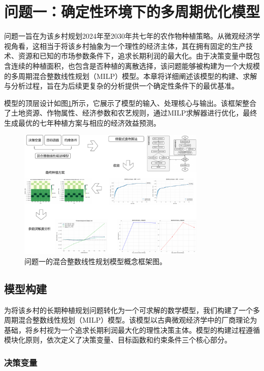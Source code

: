 \section{问题一：确定性环境下的多周期优化模型}

问题一旨在为该乡村规划2024年至2030年共七年的农作物种植策略。从微观经济学视角看，这相当于将该乡村抽象为一个理性的经济主体，其在拥有固定的生产技术、资源和已知的市场参数条件下，追求长期利润的最大化。由于决策变量中既包含连续的种植面积，也包含是否种植的离散选择，该问题能够被构建为一个大规模的多周期混合整数线性规划（MILP）模型。本章将详细阐述该模型的构建、求解与分析过程，旨在为后续更复杂的分析提供一个确定性条件下的最优基准。

模型的顶层设计如图\ref{fig:milp_framework}所示，它展示了模型的输入、处理核心与输出。该框架整合了土地资源、作物属性、经济参数和农艺规则，通过MILP求解器进行优化，最终生成最优的七年种植方案与相应的经济效益预测。

\begin{figure}[htbp]
    \centering
    \includegraphics[width=0.8\textwidth]{figs/3问题一/问题一框架.pdf}
    \caption{问题一的混合整数线性规划模型概念框架图。}
    \label{fig:milp_framework}
\end{figure}

\subsection{模型构建}


为将该乡村的长期种植规划问题转化为一个可求解的数学模型，我们构建了一个多周期混合整数线性规划（MILP）模型。该模型以古典微观经济学中的厂商理论为基础，将乡村视为一个追求长期利润最大化的理性决策主体。模型的构建过程遵循模块化原则，依次定义了决策变量、目标函数和约束条件三个核心部分。

\subsubsection{决策变量}

